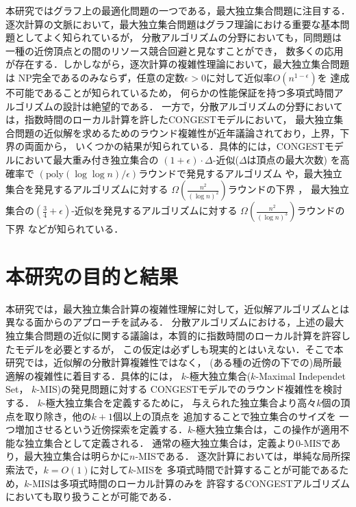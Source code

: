 \documentclass[12pt]{thesis}
\newcommand{\CONGEST}{\textsf{CONGEST}}
\theoremstyle{definition}
\begin{document}
本研究ではグラフ上の最適化問題の一つである，最大独立集合問題に注目する．
逐次計算の文脈において，最大独立集合問題はグラフ理論における重要な基本問題としてよく知られているが，
分散アルゴリズムの分野においても，同問題は一種の近傍頂点との間のリソース競合回避と見なすことができ，
数多くの応用が存在する．しかしながら，逐次計算の複雑性理論において，最大独立集合問題は
NP完全であるのみならず，任意の定数$\epsilon > 0$に対して近似率$O(n^{1-\epsilon})$を
達成不可能であることが知られているため，
何らかの性能保証を持つ多項式時間アルゴリズムの設計は絶望的である\cite{haastad1999clique}．
一方で，分散アルゴリズムの分野においては，指数時間のローカル計算を許した{\CONGEST}モデルにおいて，
最大独立集合問題の近似解を求めるためのラウンド複雑性が近年議論されており，上界，下界の両面から，
いくつかの結果が知られている．具体的には，{\CONGEST}モデルにおいて最大重み付き独立集合の
$(1 + \epsilon) \cdot \Delta$-近似($\Delta$は頂点の最大次数) を高確率で
$\left(\mathrm{poly}(\log \log n)/\epsilon \right)$ラウンドで発見するアルゴリズム
\cite{kawarabayashi2019improved} や，最大独立集合を発見するアルゴリズムに対する
$\Omega \left(\frac{n^{2}}{(\log n)^{2}}\right)$ラウンドの下界 \cite{censor2017quadratic}，
最大独立集合の$(\frac{3}{4} + \epsilon)$-近似を発見するアルゴリズムに対する
$\Omega \left(\frac{n^{2}}{(\log n)^{3}}\right)$ラウンドの下界 \cite{efron2020beyond} などが知られている．

\section{本研究の目的と結果}
本研究では，最大独立集合計算の複雑性理解に対して，近似解アルゴリズムとは異なる面からのアプローチを試みる．
分散アルゴリズムにおける，上述の最大独立集合問題の近似に関する議論は，本質的に指数時間のローカル計算を許容したモデルを必要とするが，
この仮定は必ずしも現実的とはいえない．そこで本研究では，近似解の分散計算複雑性ではなく，
(ある種の近傍の下での)局所最適解の複雑性に着目する．具体的には，
$k$-極大独立集合($k$-Maximal Independet Set， $k$-MIS)の発見問題に対する
{\CONGEST}モデルでのラウンド複雑性を検討する\cite{bollobas1991generalised}．
$k$-極大独立集合を定義するために，
与えられた独立集合より高々$k$個の頂点を取り除き，他の$k+1$個以上の頂点を
追加することで独立集合のサイズを
一つ増加させるという近傍探索を定義する．$k$-極大独立集合は，この操作が適用不能な独立集合として定義される．
通常の極大独立集合は，定義より$0$-MISであり，最大独立集合は明らかに$n$-MISである．
逐次計算においては，単純な局所探索法で，$k=O(1)$に対して$k$-MISを
多項式時間で計算することが可能であるため，$k$-MISは多項式時間のローカル計算のみを
許容する{\CONGEST}アルゴリズムにおいても取り扱うことが可能である．
\end{document}
